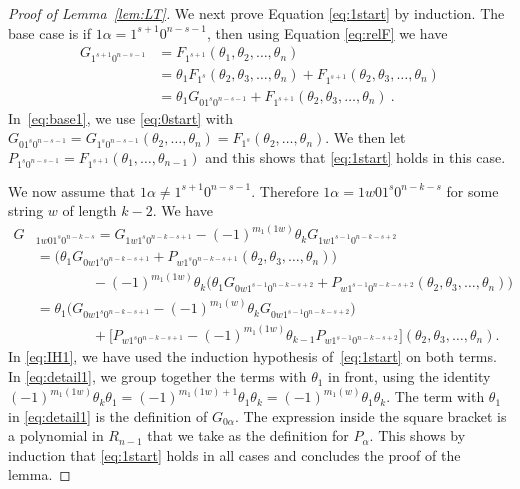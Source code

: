 \documentclass[11pt,oneside]{amsart}
\theoremstyle{definition}
\numberwithin{equation}{section}
\begin{document}
\begin{proof}[Proof of Lemma~\ref{lem:LT}]
We next prove Equation \eqref{eq:1start} by induction.  The base case is if $1\alpha = 1^{s+1}0^{n-s-1}$,
then using Equation \eqref{eq:relF} we have
\begin{align}
G_{1^{s+1}0^{n-s-1}} &= F_{1^{s+1}}(\theta_1,\theta_2 ,\ldots,\theta_n) \nonumber\\
&= \theta_1 F_{1^s} (\theta_2, \theta_3, \ldots, \theta_n)+ F_{1^{s+1}}(\theta_2, \theta_3, \ldots, \theta_n)\nonumber \\
&= \theta_1 G_{01^s0^{n-s-1}} + F_{1^{s+1}}(\theta_2, \theta_3, \ldots, \theta_n)~.\label{eq:base1}
\end{align}
In~\eqref{eq:base1}, we use \eqref{eq:0start} with  $G_{01^s0^{n-s-1}}=G_{1^s0^{n-s-1}} (\theta_2,  \ldots, \theta_n)=F_{1^s} (\theta_2, \ldots, \theta_n)$.
We then let
$P_{1^{s}0^{n-s-1}} = F_{1^{s+1}}(\theta_1,\ldots,\theta_{n-1})$ and this shows that \eqref{eq:1start} holds in this case.

We now assume that $1\alpha\ne 1^{s+1}0^{n-s-1}$. Therefore $1\alpha=1w01^s0^{n-k-s}$ for some string $w$
of length $k-2$. We have
\begin{align}
	G&_{1w01^s0^{n-k-s}}= G_{1w1^s0^{n-k-s+1}} -  (-1)^{m_1(1w)} \theta_k G_{1w1^{s-1}0^{n-k-s+2}} \nonumber \\
	 & = \big(\theta_1G_{0w1^s0^{n-k-s+1}} +P_{w1^s0^{n-k-s+1}}(\theta_2,\theta_3 ,\ldots,\theta_n)\big) \label{eq:IH1}\\
	 &\qquad\qquad  - (-1)^{m_1(1w)} \theta_k  \big(\theta_1G_{0w1^{s-1}0^{n-k-s+2}} +P_{w1^{s-1}0^{n-k-s+2}}(\theta_2,\theta_3 ,\ldots,\theta_n)\big) \nonumber\\
	 & = \theta_1\big(G_{0w1^s0^{n-k-s+1}}   - (-1)^{m_1(w)}  \theta_k G_{0w1^{s-1}0^{n-k-s+2}}\big)	 \label{eq:detail1}\\
	 &\qquad\qquad  + \big[P_{w1^s0^{n-k-s+1}}  - (-1)^{m_1(1w)} \theta_{k-1} P_{w1^{s-1}0^{n-k-s+2}}\big] (\theta_2,\theta_3 ,\ldots,\theta_n). \nonumber
\end{align}
In \eqref{eq:IH1}, we have used the induction hypothesis of~\eqref{eq:1start} on both terms.
In  \eqref{eq:detail1}, we group together the terms with $\theta_1$ in front, using the identity
$(-1)^{m_1(1w)} \theta_k \theta_1 = (-1)^{m_1(1w)+1} \theta_1 \theta_k  = (-1)^{m_1(w)} \theta_1 \theta_k $.
The term with $\theta_1$ in \eqref{eq:detail1} is the definition of $G_{0\alpha}$.
The expression inside the square bracket is a polynomial in $R_{n-1}$ that we take as the definition for $P_\alpha$.
This shows by induction that \eqref{eq:1start}
holds in all cases and concludes the  proof of the lemma.
\end{proof}
\end{document}
